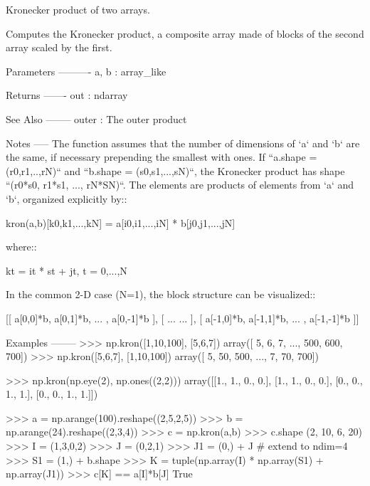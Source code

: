 \begin{DoxyVerb}Kronecker product of two arrays.

Computes the Kronecker product, a composite array made of blocks of the
second array scaled by the first.

Parameters
----------
a, b : array_like

Returns
-------
out : ndarray

See Also
--------
outer : The outer product

Notes
-----
The function assumes that the number of dimensions of `a` and `b`
are the same, if necessary prepending the smallest with ones.
If ``a.shape = (r0,r1,..,rN)`` and ``b.shape = (s0,s1,...,sN)``,
the Kronecker product has shape ``(r0*s0, r1*s1, ..., rN*SN)``.
The elements are products of elements from `a` and `b`, organized
explicitly by::

    kron(a,b)[k0,k1,...,kN] = a[i0,i1,...,iN] * b[j0,j1,...,jN]

where::

    kt = it * st + jt,  t = 0,...,N

In the common 2-D case (N=1), the block structure can be visualized::

    [[ a[0,0]*b,   a[0,1]*b,  ... , a[0,-1]*b  ],
     [  ...                              ...   ],
     [ a[-1,0]*b,  a[-1,1]*b, ... , a[-1,-1]*b ]]


Examples
--------
>>> np.kron([1,10,100], [5,6,7])
array([  5,   6,   7, ..., 500, 600, 700])
>>> np.kron([5,6,7], [1,10,100])
array([  5,  50, 500, ...,   7,  70, 700])

>>> np.kron(np.eye(2), np.ones((2,2)))
array([[1.,  1.,  0.,  0.],
       [1.,  1.,  0.,  0.],
       [0.,  0.,  1.,  1.],
       [0.,  0.,  1.,  1.]])

>>> a = np.arange(100).reshape((2,5,2,5))
>>> b = np.arange(24).reshape((2,3,4))
>>> c = np.kron(a,b)
>>> c.shape
(2, 10, 6, 20)
>>> I = (1,3,0,2)
>>> J = (0,2,1)
>>> J1 = (0,) + J             # extend to ndim=4
>>> S1 = (1,) + b.shape
>>> K = tuple(np.array(I) * np.array(S1) + np.array(J1))
>>> c[K] == a[I]*b[J]
True\end{DoxyVerb}
 \mbox{\label{namespacenumpy_1_1lib_1_1shape__base_a5c29e300011aff7533c045e73e7ce424}} 
